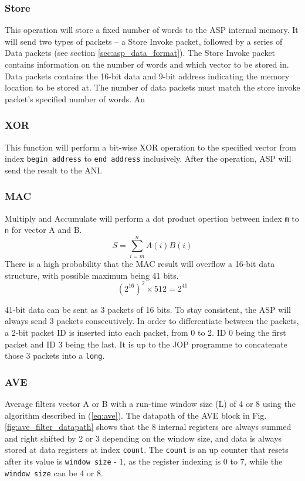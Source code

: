 \documentclass[]{article}
\begin{document}
	\subsubsection{Store}
	This operation will store a fixed number of words to the ASP internal memory. It will send two types of packets -- a Store Invoke packet, followed by a series of Data packets (see section \ref{sec:asp_data_format}). The Store Invoke packet contains information on the number of words and which vector to be stored in. Data packets contains the 16-bit data and 9-bit address indicating the memory location to be stored at. The number of data packets must match the store invoke packet's specified number of words. An 
	\subsubsection{XOR}
	This function will perform a bit-wise XOR operation to the specified vector from index \texttt{begin address} to \texttt{end address} inclusively. After the operation, ASP will send the result to the ANI.
	\subsubsection{MAC}
	Multiply and Accumulate will perform a dot product opertion between index \texttt{m} to \texttt{n} for vector A and B. 
	\begin{equation}
	S = \sum_{i=m}^{n}A(i)B(i)
	\end{equation}
	There is a high probability that the MAC result will overflow a 16-bit data structure, with possible maximum being 41 bits.
	\begin{equation}
	(2^{16})^2 \times 512 = 2^{41}
	\end{equation}
	
	\par
	41-bit data can be sent as 3 packets of 16 bits. To stay consistent, the ASP will always send 3 packets consecutively. In order to differentiate between the packets, a 2-bit packet ID is inserted into each packet, from 0 to 2. ID 0 being the first packet and ID 3 being the last. It is up to the JOP programme to concatenate those 3 packets into a \texttt{long}.
	
	\subsubsection{AVE}
	Average filters vector A or B with a run-time window size (L) of 4 or 8 using the algorithm described in (\ref{eq:ave}). The datapath of the AVE block in Fig. \ref{fig:ave_filter_datapath} shows that the 8 internal registers are always summed and right shifted by 2 or 3 depending on the window size, and data is always stored at data registers at index \texttt{count}. The \texttt{count} is an up counter that resets after its value is \texttt{window size} - 1, as the register indexing is 0 to 7, while the \texttt{window size} can be 4 or 8. \\
	
\end{document}
